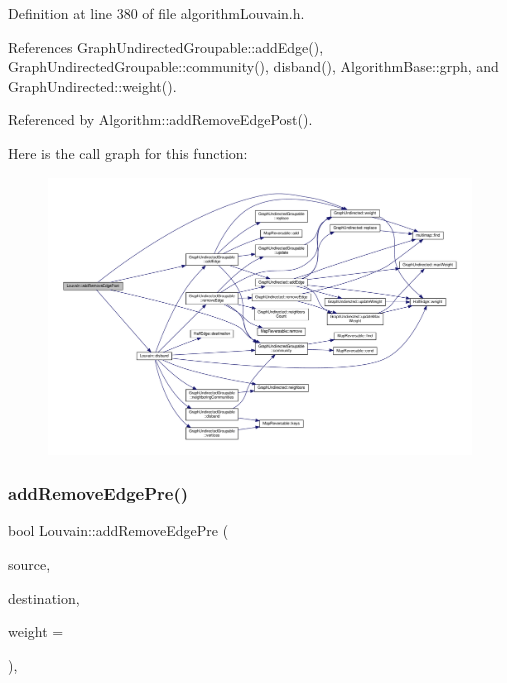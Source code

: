 Definition at line 380 of file algorithm\+Louvain.\+h.



References Graph\+Undirected\+Groupable\+::add\+Edge(), Graph\+Undirected\+Groupable\+::community(), disband(), Algorithm\+Base\+::grph, and Graph\+Undirected\+::weight().



Referenced by Algorithm\+::add\+Remove\+Edge\+Post().

Here is the call graph for this function\+:
\nopagebreak
\begin{figure}[H]
\begin{center}
\leavevmode
\includegraphics[width=350pt]{classLouvain_afdd2966eb7ca34f8ddbc67470d7d4771_cgraph}
\end{center}
\end{figure}
\mbox{\label{classLouvain_a901a012db039c09d11c03c2f7b611b66}} 
\subsubsection{\texorpdfstring{add\+Remove\+Edge\+Pre()}{addRemoveEdgePre()}}
{\footnotesize\ttfamily bool Louvain\+::add\+Remove\+Edge\+Pre (\begin{DoxyParamCaption}\item[{const \hyperlink{edge_8h_a5fbd20c46956d479cb10afc9855223f6}{type\+Vertex} \&}]{source,  }\item[{const \hyperlink{edge_8h_a5fbd20c46956d479cb10afc9855223f6}{type\+Vertex} \&}]{destination,  }\item[{const \hyperlink{edge_8h_a2e7ea3be891ac8b52f749ec73fee6dd2}{type\+Weight} \&}]{weight = {} }\end{DoxyParamCaption})\hspace{0.3cm}{\ttfamily [inline]}, {\ttfamily [virtual]}}

